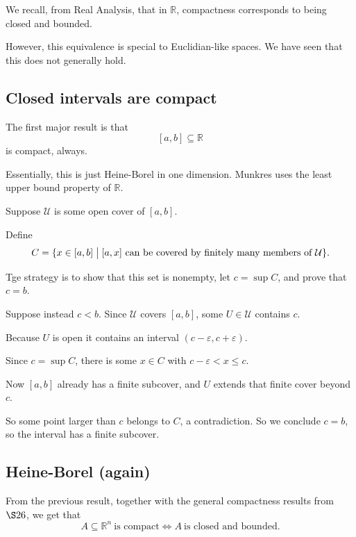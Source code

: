 \documentclass[11pt]{article}
\begin{document}
We recall, from Real Analysis, that in $\mathbb R$, 
compactness corresponds to being closed and bounded. 

However, this equivalence is special 
to Euclidian-like spaces. We have seen that 
this does not generally hold. 

\subsection{Closed intervals are compact}

The first major result is that 
\[
    [a,b] \subseteq \mathbb R 
\]
is compact, always. 

Essentially, this is just Heine-Borel in one dimension. 
Munkres uses the least upper bound property of 
$\mathbb R$. 

Suppose $\mathcal U$ is some open cover of 
$[a,b]$. 

Define 
\[
    C = \{x \in [a,b] \bigm| [a,x] \ \text{can be 
    covered by finitely many members of} \ \mathcal U\}. 
\] 

Tge strategy is to show that this set is 
nonempty, let $c = \sup C$, and prove that 
$c = b$. 

Suppose instead $c < b$. Since $\mathcal U$ covers 
$[a,b]$, some $U \in \mathcal U$ contains $c$. 

Because $U$ is open it contains an interval 
$(c - \varepsilon, c + \varepsilon)$. 

Since $c = \sup C$, there is some $x \in C$ with 
$c - \varepsilon < x \leq c$. 

Now $[a,b]$ already has a finite subcover, and 
$U$ extends that finite cover beyond $c$. 

So some point larger than $c$ belongs to $C$, a contradiction. 
So we conclude $c = b$, so the interval has a finite subcover. 

\subsection{Heine-Borel (again)}
From the previous result, together with 
the general compactness results from $\S 26$, we get 
that 
\[
    A \subseteq \mathbb R^n \ \text{is compact} 
    \Leftrightarrow A \ \text{is closed and bounded}. 
\]
\end{document}
